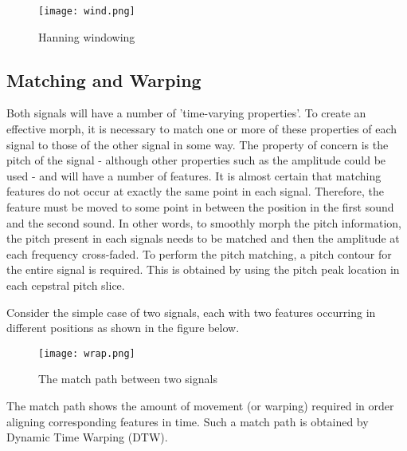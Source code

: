 \documentclass[12pt]{report}
\begin{document}
\begin{figure}[h!]
\begin{center}
  \texttt{[image: wind.png]}
  \caption{Hanning windowing}
  \label{fig:is}
\end{center}
\end{figure}




\subsection{Matching and Warping}

Both signals will have a number of 'time-varying properties'. To create an effective morph, it is necessary to match one or more of these properties of each signal to those of the other signal in some way. The property of concern is the pitch of the signal - although other properties such as the amplitude could be used - and will have a number of features. It is almost certain that matching features do not occur at exactly the same point in each signal. Therefore, the feature must be moved to some point in between the position in the first sound and the second sound. In other words, to smoothly morph the pitch information, the pitch present in each signals needs to be matched and then the amplitude at each frequency cross-faded. To perform the pitch matching, a pitch contour for the entire signal is required. This is obtained by using the pitch peak location in each cepstral pitch slice.
\newline

Consider the simple case of two signals, each with two features occurring in different positions as shown in the figure below.
\newline

\begin{figure}[h!]
\begin{center}
  \texttt{[image: wrap.png]}
  \caption{The match path between two signals  }
  \label{fig:is}
\end{center}
\end{figure}


The match path shows the amount of movement (or warping) required in order aligning corresponding features in time. Such a match path is obtained by Dynamic Time Warping (DTW).
\end{document}
